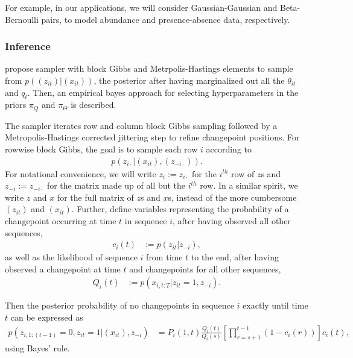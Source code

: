 For example, in our applications, we will consider Gaussian-Gaussian and
Beta-Bernoulli pairs, to model abundance and presence-absence data,
respectively.

\subsubsection{Inference}
\label{subsubsec:basic_inference}

\cite{fan2015empirical} propose sampler with block Gibbs and Metrpolis-Hastings
elements to sample from $p\left(\left(z_{it}\right) \vert
\left(x_{it}\right)\right)$, the posterior after having marginalized out all the
$\theta_{it}$ and $q_t$. Then, an empirical bayes approach for selecting
hyperparameters in the priors $\pi_{Q}$ and $\pi_{\Theta}$ is described.

The sampler iterates row and column block Gibbs sampling followed by a
Metropolis-Hastings corrected jittering step to refine changepoint positions.
For rowwise block Gibbs, the goal is to sample each row $i$ according to
\begin{align*}
  p\left(z_{i\cdot} \vert \left(x_{it}\right), \left(z_{-i \cdot}\right)\right).
\end{align*}
For notational convenience, we will write $z_{i} := z_{i\cdot}$ for the $i^{th}$
row of $z$s and $z_{-i} := z_{-i\cdot}$ for the matrix made up of all but the
$i^{th}$ row. In a similar spirit, we write $z$ and $x$ for the full matrix of
$z$s and $x$s, instead of the more cumbersome $\left(z_{it}\right)$ and
$\left(x_{it}\right)$. Further, define variables representing the probability of
a changepoint occurring at time $t$ in sequence $i$, after having observed all
other sequences,
\begin{align}
  \label{eq:basic_cit}
  c_{i}\left(t\right) &:= p\left(z_{it} \vert z_{-i}\right),
\end{align}
as well as the likelihood of sequence $i$ from time $t$ to the end, after having
observed a changepoint at time $t$ and changepoints for all other sequences,
\begin{align*}
  Q_{i}\left(t\right) &:= p\left(x_{i, t:T} \vert z_{it} = 1, z_{-i}\right).
\end{align*}

Then the posterior probability of no changepoints in sequence $i$ exactly until
time $t$ can be expressed as
\begin{align}
  p\left(z_{i, 1:\left(t - 1\right)} = 0, z_{it} = 1 \vert \left(x_{it}\right), z_{-i}\right) &= P_{i}\left(1, t\right)\frac{Q_{i}\left(t\right)}{Q_{i}\left(s\right)}\left[\prod_{r = s + 1}^{t - 1} \left(1 - c_{i}\left(r\right)\right)\right] c_{i}\left(t\right), \label{eq:first_changepoint}
\end{align}
using Bayes' rule.

